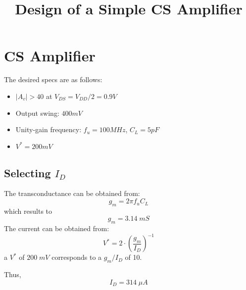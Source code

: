 \documentclass[conference]{IEEEtran}
\begin{document}
 


\title{Design of a Simple CS Amplifier}

\author{
}

\maketitle

\section{CS Amplifier} 
\noindent The desired specs are as follows:
\begin{itemize}
	\item $|A_v|>40$ at $V_{DS}=V_{DD}/2=0.9V$
	\item Output swing: $400mV$
	\item Unity-gain frequency: $f_u=100MHz$, $C_L=5pF$
	\item $V^{*}=200mV$
\end{itemize}
\subsection{Selecting $I_D$}
The transconductance can be obtained from:
\begin{equation*}
	g_m = 2\pi f_u C_L
\end{equation*}
which results to
\begin{equation*}
	g_m = 3.14\; mS
\end{equation*}
The current can be obtained from: 
\begin{equation*}
	V^* = 2\cdot\left( \frac{g_m}{I_D}\right)^{-1} 
\end{equation*} 
a $V^*$ of $200\; mV$ corresponds to a $g_m/I_D$ of 10.

\vspace{8pt}
\noindent Thus, 
\begin{equation*}
	I_D = 314\; \mu A
\end{equation*}
\end{document}
